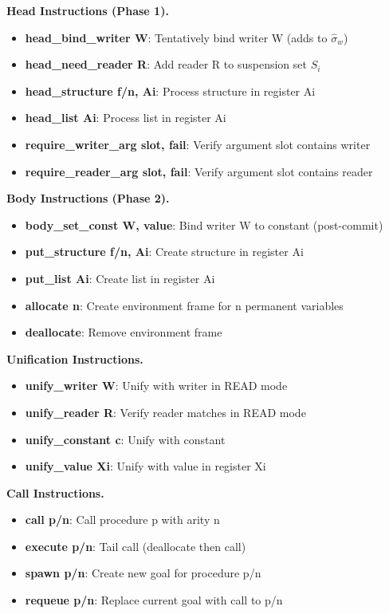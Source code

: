 \documentclass[runningheads,thm-restate]{llncs}
\newcommand{\mypara}[1]{\smallskip\noindent\textbf{#1.}}
\begin{document}
\mypara{Head Instructions (Phase 1)}
\begin{itemize}
\item \textbf{head\_bind\_writer W}: Tentatively bind writer W (adds to $\hat{\sigma}_w$)
\item \textbf{head\_need\_reader R}: Add reader R to suspension set $S_i$
\item \textbf{head\_structure f/n, Ai}: Process structure in register Ai
\item \textbf{head\_list Ai}: Process list in register Ai
\item \textbf{require\_writer\_arg slot, fail}: Verify argument slot contains writer
\item \textbf{require\_reader\_arg slot, fail}: Verify argument slot contains reader
\end{itemize}

\mypara{Body Instructions (Phase 2)}
\begin{itemize}
\item \textbf{body\_set\_const W, value}: Bind writer W to constant (post-commit)
\item \textbf{put\_structure f/n, Ai}: Create structure in register Ai
\item \textbf{put\_list Ai}: Create list in register Ai
\item \textbf{allocate n}: Create environment frame for n permanent variables
\item \textbf{deallocate}: Remove environment frame
\end{itemize}

\mypara{Unification Instructions}
\begin{itemize}
\item \textbf{unify\_writer W}: Unify with writer in READ mode
\item \textbf{unify\_reader R}: Verify reader matches in READ mode
\item \textbf{unify\_constant c}: Unify with constant
\item \textbf{unify\_value Xi}: Unify with value in register Xi
\end{itemize}

\mypara{Call Instructions}
\begin{itemize}
\item \textbf{call p/n}: Call procedure p with arity n
\item \textbf{execute p/n}: Tail call (deallocate then call)
\item \textbf{spawn p/n}: Create new goal for procedure p/n
\item \textbf{requeue p/n}: Replace current goal with call to p/n
\end{itemize}
\end{document}
